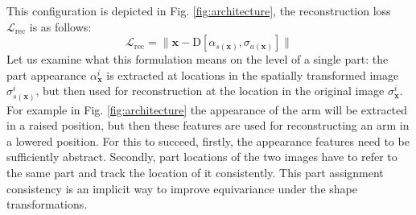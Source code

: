 	This configuration is depicted in Fig. \ref{fig:architecture}, the reconstruction loss $\mathcal{L}_{\textrm{rec}}$ is as follows:
	\begin{equation}
	\mathcal{L}_{\textrm{rec}}= \lVert  \mathbf{x}  - \mathrm{D}[{\alpha}_{s(\mathbf{x})}, {\sigma}_{a(\mathbf{x})}]\rVert
	\end{equation}
	\label{eq:loss_rec}
	Let us examine what this formulation means on the level of a single part: the part appearance $\alpha^i_{\mathbf{x}}$ is extracted at locations in the spatially transformed image ${\sigma}^i_{s(\mathbf{x})}$, but then used for reconstruction at the location in the original image ${\sigma}^i_{\mathbf{x}}$. For example in Fig.  \ref{fig:architecture} the appearance of the arm will be extracted in a raised position, but then these features are used for reconstructing an arm in a lowered position. For this to succeed, firstly, the appearance features need to be sufficiently abstract. Secondly, part locations of the two images have to refer to the same part and track the location of it consistently. This part assignment consistency is an implicit way to improve equivariance under the shape transformations.\\
